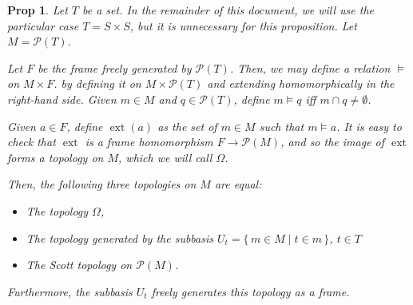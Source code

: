 \documentclass{article}
\theoremstyle{definition}
\theoremstyle{plain}
\newtheorem*{prop}{Prop}
\DeclareMathOperator{\ext}{ext}
\newcommand{\ps}{\mathcal{P}}
\begin{document}
\begin{prop}
Let $T$ be a set. In the remainder of this document, we will use the particular case $T = S \times S$, but it is unnecessary for this proposition. Let $M = \ps(T)$.

Let $F$ be the frame freely generated by $\ps(T)$. Then, we may define a relation $\vDash$ on $M \times F$. by defining it on $M \times \ps(T)$ and extending homomorphically in the right-hand side. Given $m \in M$ and $q \in \ps(T)$, define $m \vDash q$ iff $m \cap q \neq \emptyset$.

Given $a \in F$, define $\ext(a)$ as the set of $m \in M$ such that $m \vDash a$. It is easy to check that $\ext$ is a frame homomorphism $F \to \ps(M)$, and so the image of $\ext$ forms a topology on $M$, which we will call $\Omega$.

Then, the following three topologies on $M$ are equal:
\begin{itemize}
\item The topology $\Omega$,
\item The topology generated by the subbasis $U_{t} = \{\, m \in M \mid t \in m \,\}$, $t \in T$
\item The Scott topology on $\ps(M)$.
\end{itemize}

Furthermore, the subbasis $U_{t}$ freely generates this topology as a frame.
\end{prop}
\end{document}

